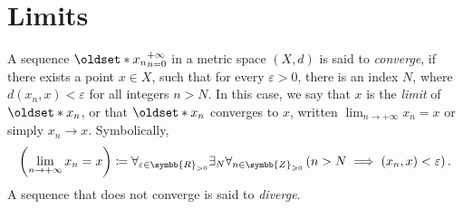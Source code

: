 \chapter{Limits}

\begin{definition}
    A sequence \(\set{x_n}_{n=0}^{+\infty}\) in a metric space \(\left(X,d\right)\) is said to \emph{converge}, if there exists a point \(x\in X\), such that for every \(\varepsilon>0\), there is an index \(N\), where \(d\left(x_n,x\right)<\varepsilon\) for all integers \(n>N\). In this case, we say that \(x\) is the \emph{limit} of \(\set{x_n}\), or that \(\set{x_n}\) converges to \(x\), written \(\lim_{n\to+\infty}x_n=x\) or simply \(x_n\to x\). Symbolically, \[\left(\lim_{n\to+\infty}x_n=x\right)\coloneq\forall_{\varepsilon\in\symbb{R}_{>0}}\exists_N\forall_{n\in\symbb{Z}_{\geqslant0}}\left(n>N\implies\left(x_n,x\right)<\varepsilon\right).\] A sequence that does not converge is said to \emph{diverge}.
\end{definition}
